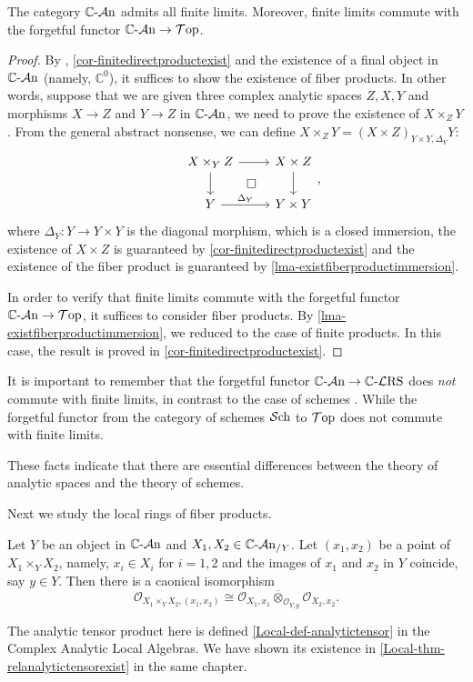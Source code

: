 \begin{corollary}
    The category $\mathbb{C}\text{-}\mathcal{A}\mathrm{n}$ admits all finite limits. Moreover, finite limits commute with the forgetful functor $\mathbb{C}\text{-}\mathcal{A}\mathrm{n}\rightarrow \mathcal{T}\mathrm{op}$.
\end{corollary}
\begin{proof}
    By \cite[\href{https://stacks.math.columbia.edu/tag/002O}{Tag 002O}]{stacks-project}, \cref{cor-finitedirectproductexist} and the existence of a final object in $\mathbb{C}\text{-}\mathcal{A}\mathrm{n}$ (namely, $\mathbb{C}^0$), it suffices to show the existence of fiber products. In other words, suppose that we are given three complex analytic spaces $Z,X,Y$ and morphisms $X\rightarrow Z$ and $Y\rightarrow Z$ in $\mathbb{C}\text{-}\mathcal{A}\mathrm{n}$, we need to prove the existence of $X\times_Z Y$. From the general abstract nonsense, we can define $X\times_Z Y=(X\times Z)_{Y\times Y,\Delta_Y}Y$:
    \[ 
    \begin{tikzcd}
        & X\times_Y Z \arrow[r]\arrow[d]\arrow[rd,"\square",phantom] & X\times Z \arrow[d]\\
        & Y  \arrow[r,"\Delta_Y"] & Y\times Y
    \end{tikzcd},
    \]
    where $\Delta_Y:Y\rightarrow Y\times Y$ is the diagonal morphism, which is a closed immersion, the existence of $X\times Z$ is guaranteed by \cref{cor-finitedirectproductexist} and the existence of the fiber product is guaranteed by \cref{lma-existfiberproductimmersion}.

    In order to verify that finite limits commute with the forgetful functor $\mathbb{C}\text{-}\mathcal{A}\mathrm{n}\rightarrow \mathcal{T}\mathrm{op}$, it suffices to consider fiber products. By \cref{lma-existfiberproductimmersion}, we reduced to the case of finite products. In this case, the result is proved in \cref{cor-finitedirectproductexist}.
\end{proof}
\begin{remark}
    It is important to remember that the forgetful functor $\mathbb{C}\text{-}\mathcal{A}\mathrm{n}\rightarrow \mathbb{C}\text{-}\mathcal{L}\mathrm{RS}$ does \emph{not} commute with finite limits, in contrast to the case of schemes \cite[\href{https://stacks.math.columbia.edu/tag/01JN}{Tag 01JN}]{stacks-project}. While the forgetful functor from the category of schemes $\mathcal{S}\mathrm{ch}$ to $\mathcal{T}\mathrm{op}$ does not commute with finite limits.
    
    These facts indicate that there are essential differences between the theory of analytic spaces and the theory of schemes.
\end{remark}

Next we study the local rings of fiber products.
\begin{theorem}
    Let $Y$ be an object in $\mathbb{C}\text{-}\mathcal{A}\mathrm{n}$ and $X_1,X_2\in \mathbb{C}\text{-}\mathcal{A}\mathrm{n}_{/Y}$. Let $(x_1,x_2)$ be a point of $X_1\times_Y X_2$, namely, $x_i\in X_i$ for $i=1,2$ and the images of $x_1$ and $x_2$ in $Y$ coincide, say $y\in Y$. 
    Then there is a caonical isomorphism
    \[
        \mathcal{O}_{X_1\times_Y X_2, (x_1,x_2)}\cong \mathcal{O}_{X_1,x_1}\overline{\otimes}_{\mathcal{O}_{Y,y}}  \mathcal{O}_{X_2,x_2}.     
    \]
\end{theorem}
The analytic tensor product here is defined \cref{Local-def-analytictensor} in the Complex Analytic Local Algebras. We have shown its existence in \cref{Local-thm-relanalytictensorexist} in the same chapter.

